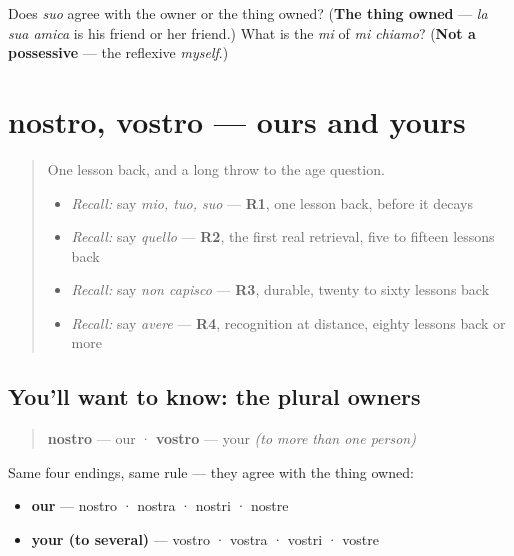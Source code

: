 \begin{tcolorbox}[breakable,colback=teal!4,colframe=teal!35!black,title={Before you move on}]
Does \emph{suo} agree with the owner or the thing owned? (\textbf{The thing owned} — \emph{la sua amica} is his friend or her friend.) What is the \emph{mi} of \emph{mi chiamo}? (\textbf{Not a possessive} — the reflexive \emph{myself}.)
\end{tcolorbox}
\section[nostro, vostro]{nostro, vostro — ours and yours}

\label{lesson:IT-C34-nostro-vostro}



\begin{quote}
One lesson back, and a long throw to the age question.

\begin{itemize}
\raggedright
  \item \emph{Recall:} say \emph{mio, tuo, suo} — \textbf{R1}, one lesson back, before it decays
  \item \emph{Recall:} say \emph{quello} — \textbf{R2}, the first real retrieval, five to fifteen lessons back
  \item \emph{Recall:} say \emph{non capisco} — \textbf{R3}, durable, twenty to sixty lessons back
  \item \emph{Recall:} say \emph{avere} — \textbf{R4}, recognition at distance, eighty lessons back or more
\end{itemize}
\end{quote}

\subsection*{You'll want to know: the plural owners}
\begin{quote}
\textbf{nostro} — our · \textbf{vostro} — your \emph{(to more than one person)}
\end{quote}

Same four endings, same rule — they agree with the thing owned:

\begin{itemize}
\raggedright
  \item \textbf{our} — nostro · nostra · nostri · nostre
  \item \textbf{your (to several)} — vostro · vostra · vostri · vostre
\end{itemize}

